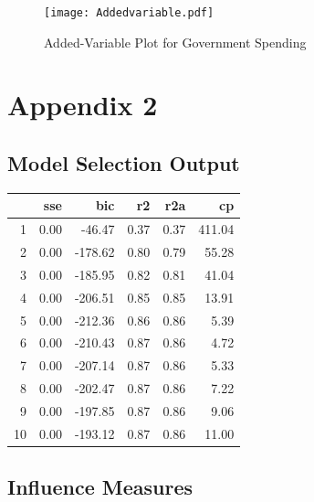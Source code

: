 \documentclass[12pt]{article}
\begin{document}
\begin{figure}
	\centering
	\texttt{[image: Addedvariable.pdf]}
	\caption{Added-Variable Plot for Government Spending}
	\label{fig:added}
\end{figure}


\newpage

\section{Appendix 2}

\subsection{Model Selection Output}
\begin{table}[ht]
	\centering
	\begin{tabular}{rrrrrr}
		\hline
		& sse & bic & r2 & r2a & cp \\
		\hline
		1 & 0.00 & -46.47 & 0.37 & 0.37 & 411.04 \\
		2 & 0.00 & -178.62 & 0.80 & 0.79 & 55.28 \\
		3 & 0.00 & -185.95 & 0.82 & 0.81 & 41.04 \\
		4 & 0.00 & -206.51 & 0.85 & 0.85 & 13.91 \\
		5 & 0.00 & -212.36 & 0.86 & 0.86 & 5.39 \\
		6 & 0.00 & -210.43 & 0.87 & 0.86 & 4.72 \\
		7 & 0.00 & -207.14 & 0.87 & 0.86 & 5.33 \\
		8 & 0.00 & -202.47 & 0.87 & 0.86 & 7.22 \\
		9 & 0.00 & -197.85 & 0.87 & 0.86 & 9.06 \\
		10 & 0.00 & -193.12 & 0.87 & 0.86 & 11.00 \\
		\hline
	\end{tabular}
\end{table}

\subsection{Influence Measures}
\end{document}
